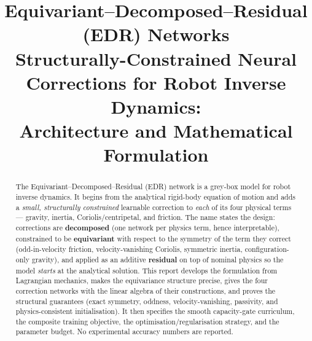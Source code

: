 \documentclass[11pt]{article}
\title{\textbf{Equivariant--Decomposed--Residual (EDR) Networks}\\[4pt]
\large Structurally-Constrained Neural Corrections for Robot Inverse Dynamics:\\
Architecture and Mathematical Formulation}
\author{}
\date{}
\theoremstyle{definition}
\theoremstyle{plain}
\begin{document}
\maketitle
\vspace{-2.4em}

\begin{abstract}
\noindent
The Equivariant--Decomposed--Residual (EDR) network is a grey-box model for robot
inverse dynamics. It begins from the analytical rigid-body equation of motion and
adds a \emph{small, structurally constrained} learnable correction to \emph{each}
of its four physical terms --- gravity, inertia, Coriolis/centripetal, and
friction. The name states the design: corrections are \textbf{decomposed}
(one network per physics term, hence interpretable), constrained to be
\textbf{equivariant} with respect to the symmetry of the term they correct
(odd-in-velocity friction, velocity-vanishing Coriolis, symmetric inertia,
configuration-only gravity), and applied as an additive \textbf{residual} on top
of nominal physics so the model \emph{starts} at the analytical solution. This
report develops the formulation from Lagrangian mechanics, makes the equivariance
structure precise, gives the four correction networks with the linear algebra of
their constructions, and proves the structural guarantees (exact symmetry,
oddness, velocity-vanishing, passivity, and physics-consistent initialisation).
It then specifies the smooth capacity-gate curriculum, the composite training
objective, the optimisation/regularisation strategy, and the parameter budget. No
experimental accuracy numbers are reported.
\end{abstract}

\end{document}
